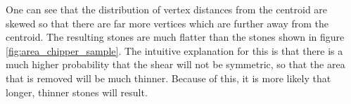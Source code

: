 One can see that the distribution of vertex distances from the centroid are skewed so that there are far more vertices which are further away from the centroid. The resulting stones are much flatter than the stones shown in figure \ref{fig:area_chipper_sample}. The intuitive explanation for this is that there is a much higher probability that the shear will not be symmetric, so that the area that is removed will be much thinner. Because of this, it is more likely that longer, thinner stones will result.
